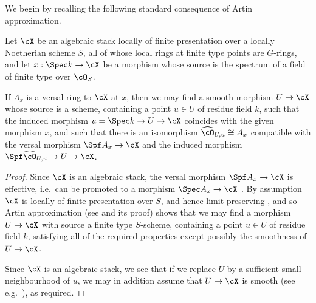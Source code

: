 We begin by recalling the following standard consequence of Artin approximation.
\begin{alemma}
  \label{lem: Artin approximation by smooth morphism}
  Let $\cX$ be an algebraic stack locally of finite presentation
over a locally Noetherian scheme $S$,
all of whose local rings at finite type points are $G$-rings,
and let $x: \Spec k \to \cX$ be a morphism whose source is the spectrum
of a field of finite type over $\cO_S$.

If $A_x$ is a versal ring to $\cX$ at $x$, then we may find a smooth
morphism $U\to\cX$ whose source is a scheme, containing a point $u \in U$ of residue field $k$,
such that the induced morphism $u = \Spec k  \to U \to \cX$
coincides with the given morphism $x$,
and such that there is an isomorphism $\widehat{\cO}_{U,u} \cong
A_x$ compatible with the versal morphism $\Spf A_x \to \cX$
and the induced morphism $\Spf \widehat{\cO}_{U,u} \to U \to \cX$.
\end{alemma}
\begin{proof}Since $\cX$ is an algebraic stack,
the versal morphism $\Spf A_x \to \cX$ is effective,
i.e.\ can be promoted to a morphism $\Spec A_x \to \cX$
\cite[\href{http://stacks.math.columbia.edu/tag/07X8}{Lem.~07X8}]{stacks-project}.
By assumption $\cX$ is locally of finite presentation over $S$,
and hence limit preserving \cite[Lem.~2.1.9]{EGstacktheoreticimages},
and so Artin approximation
(see \cite[\href{http://stacks.math.columbia.edu/tag/07XH}{Lem.~07XH}]{stacks-project} and its proof)
shows that we may find a morphism $U \to \cX$ with source a finite type 
$S$-scheme, containing a point $u \in U$ of residue field $k$,
satisfying all of the required properties except possibly the
smoothness of $U\to\cX$.

Since $\cX$ is an algebraic stack, we see that if we replace
$U$ by a sufficient small neighbourhood of $u$, we may in addition
assume that $U \to \cX$ is smooth
(see e.g.\ \cite[Lem.~2.4.7~(4)]{EGstacktheoreticimages}), as required. 
\end{proof}


